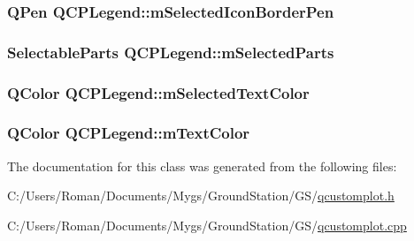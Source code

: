 \subsubsection[{m\+Selected\+Icon\+Border\+Pen}]{\setlength{\rightskip}{0pt plus 5cm}Q\+Pen Q\+C\+P\+Legend\+::m\+Selected\+Icon\+Border\+Pen\hspace{0.3cm}{\ttfamily [protected]}}\label{class_q_c_p_legend_a7429ac0e64c7b90b649b4d8f4cc5fa55}
\hypertarget{class_q_c_p_legend_a917a34dd2856baafd8d56852d94d00e2}{}
\subsubsection[{m\+Selected\+Parts}]{\setlength{\rightskip}{0pt plus 5cm}Selectable\+Parts Q\+C\+P\+Legend\+::m\+Selected\+Parts\hspace{0.3cm}{\ttfamily [protected]}}\label{class_q_c_p_legend_a917a34dd2856baafd8d56852d94d00e2}
\hypertarget{class_q_c_p_legend_a6c25c8796c6e73e983aae6024965f2be}{}
\subsubsection[{m\+Selected\+Text\+Color}]{\setlength{\rightskip}{0pt plus 5cm}Q\+Color Q\+C\+P\+Legend\+::m\+Selected\+Text\+Color\hspace{0.3cm}{\ttfamily [protected]}}\label{class_q_c_p_legend_a6c25c8796c6e73e983aae6024965f2be}
\hypertarget{class_q_c_p_legend_a478b2d809a7390e9ff8f8bb70d6bd9fe}{}
\subsubsection[{m\+Text\+Color}]{\setlength{\rightskip}{0pt plus 5cm}Q\+Color Q\+C\+P\+Legend\+::m\+Text\+Color\hspace{0.3cm}{\ttfamily [protected]}}\label{class_q_c_p_legend_a478b2d809a7390e9ff8f8bb70d6bd9fe}


The documentation for this class was generated from the following files\+:\begin{DoxyCompactItemize}
\item 
C\+:/\+Users/\+Roman/\+Documents/\+Mygs/\+Ground\+Station/\+G\+S/\hyperlink{qcustomplot_8h}{qcustomplot.\+h}\item 
C\+:/\+Users/\+Roman/\+Documents/\+Mygs/\+Ground\+Station/\+G\+S/\hyperlink{qcustomplot_8cpp}{qcustomplot.\+cpp}\end{DoxyCompactItemize}
